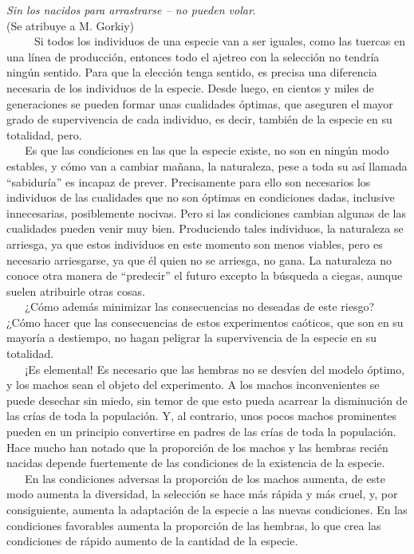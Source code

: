 \noindent
\textit{Sin los nacidos para arrastrarse -- no pueden volar}.\\
(Se atribuye a M. Gorkiy)\\



~ ~ ~ Si todos los individuos de una especie van a ser iguales, como las
tuercas en una línea de producción, entonces todo el ajetreo con la
selección no tendría ningún sentido. Para que la elección tenga sentido,
es precisa una diferencia necesaria de los individuos de la especie.
Desde luego, en cientos y miles de generaciones se pueden formar unas
cualidades óptimas, que aseguren el mayor grado de supervivencia de cada
individuo, es decir, también de la especie en su totalidad, pero.\\
\hspace*{0.333em} ~ ~ Es que las condiciones en las que la especie
existe, no son en ningún modo estables, y cómo van a cambiar mañana, la
naturaleza, pese a toda su así llamada ``sabiduría'' es incapaz de
prever. Precisamente para ello son necesarios los individuos de las
cualidades que no son óptimas en condiciones dadas, inclusive
innecesarias, posiblemente nocivas. Pero si las condiciones cambian
algunas de las cualidades pueden venir muy bien. Produciendo tales
individuos, la naturaleza se arriesga, ya que estos individuos en este
momento son menos viables, pero es necesario arriesgarse, ya que él
quien no se arriesga, no gana. La naturaleza no conoce otra manera de
``predecir'' el futuro excepto la búsqueda a ciegas, aunque suelen
atribuirle otras cosas.\\
\hspace*{0.333em} ~ ~ ¿Cómo además minimizar las consecuencias no
deseadas de este riesgo? ¿Cómo hacer que las consecuencias de estos
experimentos caóticos, que son en su mayoría a destiempo, no hagan
peligrar la supervivencia de la especie en su totalidad.\\
\hspace*{0.333em} ~ ~ ¡Es elemental! Es necesario que las hembras no se
desvíen del modelo óptimo, y los machos sean el objeto del experimento.
A los machos inconvenientes se puede desechar sin miedo, sin temor de
que esto pueda acarrear la disminución de las crías de toda la
populación. Y, al contrario, unos pocos machos prominentes pueden en un
principio convertirse en padres de las crías de toda la populación. Hace
mucho han notado que la proporción de los machos y las hembras recién
nacidas depende fuertemente de las condiciones de la existencia de la
especie.\\
\hspace*{0.333em} ~ ~ En las condiciones adversas la proporción de los
machos aumenta, de este modo aumenta la diversidad, la selección se hace
más rápida y más cruel, y, por consiguiente, aumenta la adaptación de la
especie a las nuevas condiciones. En las condiciones favorables aumenta
la proporción de las hembras, lo que crea las condiciones de rápido
aumento de la cantidad de la especie.

